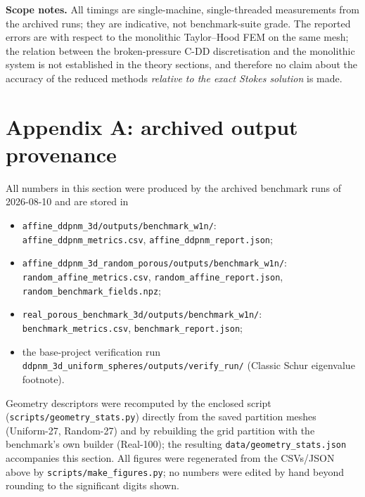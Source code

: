 \documentclass[11pt,a4paper]{article}
\begin{document}
\textbf{Scope notes.}  All timings are single-machine, single-threaded
measurements from the archived runs; they are indicative, not
benchmark-suite grade.  The reported errors are with respect to the
monolithic Taylor--Hood FEM on the same mesh; the relation between the
broken-pressure C-DD discretisation and the monolithic system is not
established in the theory sections, and therefore no claim about the
accuracy of the reduced methods \emph{relative to the exact Stokes
solution} is made.

\section*{Appendix A: archived output provenance}
\label{app:provenance}

All numbers in this section were produced by the archived benchmark
runs of 2026-08-10 and are stored in
\begin{itemize}[nosep,leftmargin=*]
\item \texttt{affine\_ddpnm\_3d/outputs/benchmark\_w1n/}:\\
  \texttt{affine\_ddpnm\_metrics.csv}, \texttt{affine\_ddpnm\_report.json};
\item \texttt{affine\_ddpnm\_3d\_random\_porous/outputs/benchmark\_w1n/}:\\
  \texttt{random\_affine\_metrics.csv}, \texttt{random\_affine\_report.json},
  \texttt{random\_benchmark\_fields.npz};
\item \texttt{real\_porous\_benchmark\_3d/outputs/benchmark\_w1n/}:\\
  \texttt{benchmark\_metrics.csv}, \texttt{benchmark\_report.json};
\item the base-project verification run\\
  \texttt{ddpnm\_3d\_uniform\_spheres/outputs/verify\_run/} (Classic
  Schur eigenvalue footnote).
\end{itemize}
Geometry descriptors were recomputed by the enclosed script
(\texttt{scripts/geometry\_stats.py}) directly from the saved
partition meshes (Uniform-27, Random-27) and by rebuilding the grid
partition with the benchmark's own builder (Real-100); the resulting
\texttt{data/geometry\_stats.json} accompanies this section.  All
figures were regenerated from the CSVs/JSON above by
\texttt{scripts/make\_figures.py}; no numbers were edited by hand
beyond rounding to the significant digits shown.
\end{document}
